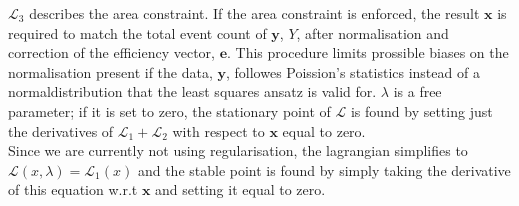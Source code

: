    $\mathcal{L}_3$ describes the area constraint. If the area constraint is enforced, the result $\mathbf{x}$ is required to match the total event count of $\mathbf{y}$, $Y$, after normalisation and correction of the efficiency vector, $\mathbf{e}$. This procedure limits prossible biases on the normalisation present if the data, $\mathbf{y}$, followes Poission's statistics instead of a normaldistribution that the least squares ansatz is valid for. $\lambda$ is a free parameter; if it is set to zero, the stationary point of $\mathcal{L}$ is found by setting just the derivatives of $\mathcal{L}_1+\mathcal{L}_2$ with respect to $\mathbf{x}$ equal to zero.\\
   Since we are currently not using regularisation, the lagrangian simplifies to $\mathcal{L}(x, \lambda) = \mathcal{L}_1(x)$ and the stable point is found by simply taking the derivative of this equation w.r.t $\mathbf{x}$ and setting it equal to zero.\\
